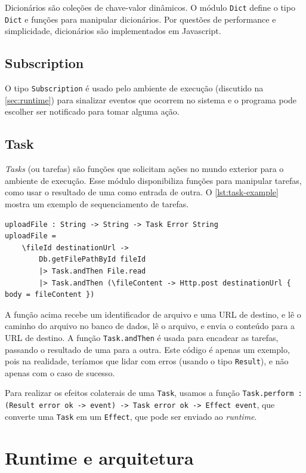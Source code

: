 Dicionários são coleções de chave-valor dinâmicos. O módulo \texttt{Dict} define
o tipo \texttt{Dict} e funções para manipular dicionários. Por questões de performance
e simplicidade, dicionários são implementados em Javascript.

\subsection{Subscription}

O tipo \texttt{Subscription} é usado pelo ambiente de execução (discutido na
\autoref{sec:runtime}) para sinalizar eventos que ocorrem no sistema e o programa
pode escolher ser notificado para tomar alguma ação.

\subsection{Task}

\textit{Tasks} (ou tarefas) são funções que solicitam ações no mundo exterior para
o ambiente de execução. Esse módulo disponibiliza funções para manipular tarefas,
como usar o resultado de uma como entrada de outra. O \autoref{lst:task-example}
mostra um exemplo de sequenciamento de tarefas.

\begin{lstlisting}[label={lst:task-example},caption={Exemplo de sequenciamento de tarefas}]
uploadFile : String -> String -> Task Error String
uploadFile =
    \fileId destinationUrl ->
        Db.getFilePathById fileId
        |> Task.andThen File.read
        |> Task.andThen (\fileContent -> Http.post destinationUrl { body = fileContent })
\end{lstlisting}

A função acima recebe um identificador de arquivo e uma URL de destino, e lê
o caminho do arquivo no banco de dados, lê o arquivo, e envia o conteúdo para
a URL de destino. A função \texttt{Task.andThen} é usada para encadear as tarefas,
passando o resultado de uma para a outra. Este código é apenas um exemplo, pois
na realidade, teríamos que lidar com erros (usando o tipo \texttt{Result}), e
não apenas com o caso de sucesso.

Para realizar os efeitos colaterais de uma \texttt{Task}, usamos a função
\texttt{Task.perform : (Result error ok -> event) -> Task error ok -> Effect event},
que converte uma \texttt{Task} em um \texttt{Effect}, que pode ser enviado ao
\textit{runtime}.


\section{Runtime e arquitetura}\label{sec:runtime}


